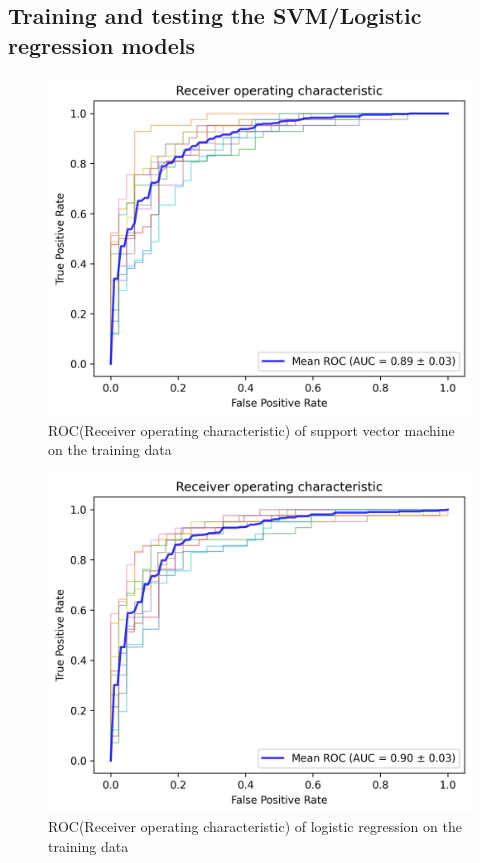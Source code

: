 \documentclass{cernatsnote}
\begin{document}
\newpage
\subsection{Training and testing the SVM/Logistic regression models}

\begin{figure}
    \centering
    \includegraphics[width=0.8\linewidth]{images/ROC_training_SVM.png}
    \caption{ROC(Receiver operating characteristic) of support vector machine on the training data}
    \label{ROC_training_SVM}
\end{figure}


\begin{figure}
    \centering
    \includegraphics[width=0.8\linewidth]{images/ROC_training_lreg.png}
    \caption{ROC(Receiver operating characteristic) of logistic regression on the training data}
    \label{ROC_training_lreg}
\end{figure}
\end{document}

